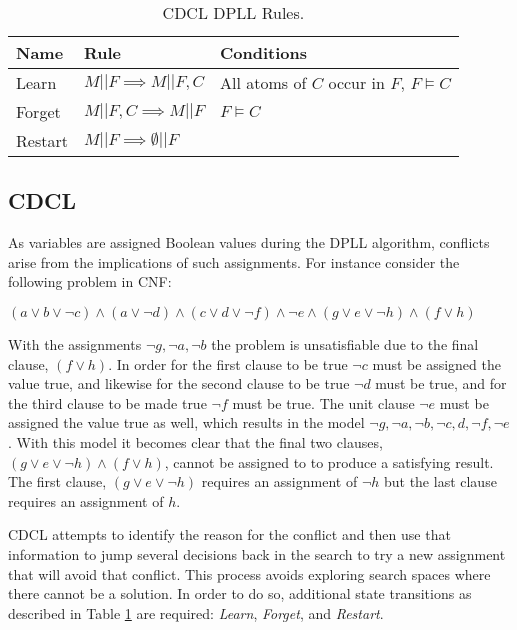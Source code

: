 \documentclass[]{final_report}
\begin{document}
\begin{table}[t]
\centering
\begin{tabular}{|l|l|l|}
\hline
Name & Rule & Conditions  \\ \hline
Learn & $M|| F \implies M || F, C$ & All atoms of $C$ occur in $F$, $F \models C$  \\ \hline
Forget & $M|| F, C \implies M || F $ & $F \models C$  \\ \hline
Restart & $M|| F \implies \emptyset || F$ &  \\ \hline
\end{tabular}
\caption{CDCL DPLL Rules.}
\label{table:cdcl-rules}
\end{table}

\subsection{CDCL}
As variables are assigned Boolean values during the DPLL algorithm, conflicts arise from the implications of such assignments. For instance consider the following problem in CNF:

$(a \lor b \lor \lnot c) \land (a \lor \lnot d) \land (c \lor d \lor \lnot{f}) \land \lnot{e} \land (g \lor e \lor \lnot h) \land (f \lor h)$

With the assignments $\lnot{g}, \lnot{a}, \lnot{b}$ the problem is unsatisfiable due to the final clause, $(f \lor h)$. In order for the first clause to be true $\lnot c$ must be assigned the value true, and likewise for the second clause to be true $\lnot d$ must be true, and for the third clause to be made true $\lnot{f}$ must be true. The unit clause $\lnot{e}$ must be assigned the value true as well, which results in the model $\lnot{g}, \lnot{a}, \lnot{b}, \lnot{c}, d, \lnot{f}, \lnot{e}$. With this model it becomes clear that the final two clauses, $(g \lor e \lor \lnot h) \land (f \lor h)$, cannot be assigned to to produce a satisfying result. The first clause, $(g \lor e \lor \lnot h)$ requires an assignment of $\lnot{h}$ but the last clause requires an assignment of $h$.

CDCL attempts to identify the reason for the conflict and then use that information to jump several decisions back in the search to try a new assignment that will avoid that conflict. This process avoids exploring search spaces where there cannot be a solution. In order to do so, additional state transitions as described in Table \ref{table:cdcl-rules} are required: \textit{Learn}, \textit{Forget}, and \textit{Restart}.
\end{document}
